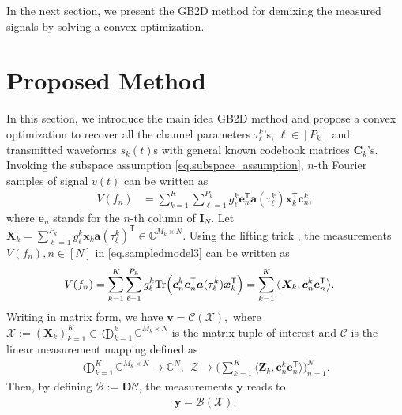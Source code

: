 \documentclass[conference,10pt]{IEEEtran}
\theoremstyle{remark}
\theoremstyle{plain}
\theoremstyle{definition}
\theoremstyle{remark}
\begin{document}
  


In the next section, we present the \ac{GB2D} method for demixing the measured signals by solving a convex optimization.

 

\section{Proposed Method}\label{sec.proposed}
 In this section, we introduce the main idea \ac{GB2D} method and propose a convex optimization to recover all the channel parameters ${\tau}_{\ell}^k$'s, $\ell \in [P_k]$ and transmitted waveforms $s_k(t)$s with general known codebook matrices $\bm{C}_k$'s.  Invoking the subspace assumption \eqref{eq.subspace_assumption},  $n$-th Fourier samples of signal $v(t)$ can be written as 
 \begin{align}\label{eq.sampledmodel3}
 V(f_n)&= \sum_{k=1}^K\sum_{\ell=1}^{P_k}g_{\ell}^k\bm{e}_n^{\mathsf{T}}\bm{a}(\tau_{\ell}^k)\bm{x}_k^{\mathsf{T}}\bm{c}^k_n,
 \end{align}
 where $\bm{e}_n$ stands for the $n$-th column of $\bm{I}_{N}$. Let $\bm{X}_k=\sum_{\ell=1}^{P_k} g_{\ell}^k\bm{x}_k\bm{a}(\tau_{\ell}^k)^{\mathsf{T}}\in\mathbb{C}^{M_k\times N}$. Using the lifting trick \cite{ling2015self}, the measurements $V(f_n), n\in [N]$ in \eqref{eq.sampledmodel3} can be written as
 \begin{align*}
 &V(f_n)=\sum_{k=1}^K\sum_{\ell=1}^{P_k}g_{\ell}^k {\rm Tr}\Big(\bm{c}^k_n\bm{e}_n^{\mathsf{T}}\bm{a}(\tau_{\ell}^k)\bm{x}_k^{\mathsf{T}}\Big)=\sum_{k=1}^K\big\langle \bm{X}_k, \bm{c}^k_n\bm{e}_n^{\mathsf{T}}\big\rangle.
 \end{align*} 
 Writing in matrix form, we have $\bm{v}=\mathcal{C}(\bm{\mathcal{X}}),$ where $\bm{\mathcal{X}}:=(\bm{X}_k)_{k=1}^K\in \bigoplus_{k=1}^k\mathbb{C}^{M_k\times N}$ is the matrix tuple of interest and $\mathcal{C}$ is the linear measurement mapping defined as
 \begin{align*}
 \bigoplus_{k=1}^K\mathbb{C}^{M_k\times N}\rightarrow \mathbb{C}^N,~~ \bm{\mathcal{Z}}\rightarrow \Bigg(\sum_{k=1}^K\big\langle \bm{Z}_k, \bm{c}^k_n\bm{e}_n^{\mathsf{T}}\big\rangle\Bigg)_{n=1}^{N}.	
 \end{align*}
Then, by defining $ \mathcal{B} := \bm{D}\mathcal{C}$, the measurements $\bm{y}$ reads to
\begin{align}\label{eq:measure_model1}
    \bm{y}  =  \mathcal{B}(\bm{\mathcal{X}}). 
\end{align} 
 
\end{document}
